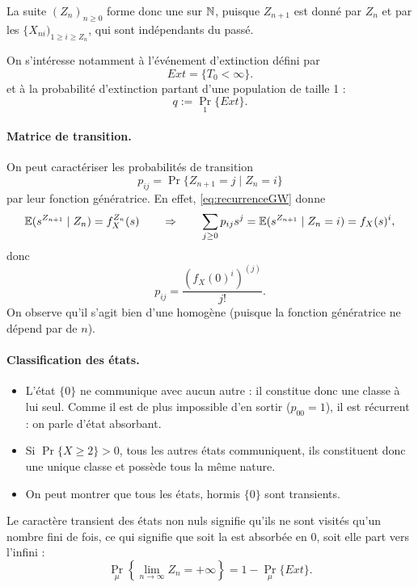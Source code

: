 La suite $(Z_n)_{n \geq 0}$ forme donc une \cM sur $\mathbb{N}$, puisque $Z_{n+1}$ est donné par $Z_n$ et par les $\{X_{ni})_{1 \geq i \geq Z_n}$, qui sont indépendants du passé.

\bigskip
On s'intéresse notamment à l'événement d'extinction défini par 
$$
Ext = \{T_0 < \infty\}.
$$
et à la probabilité d'extinction partant d'une population de taille 1 : 
$$
q := \Pr_1\{Ext\}.
$$


\paragraph*{Matrice de transition.} 
On peut caractériser les probabilités de transition 
$$
p_{ij} = \Pr\{Z_{n+1} = j \mid Z_n = i\}
$$
par leur fonction génératrice. En effet, \eqref{eq:recurrenceGW} donne
$$
\operatorname{\mathbb{E}}(s^{Z_{n+1}} \mid Z_n) = f_X^{Z_n}(s)
\qquad \Rightarrow \qquad 
\sum_{j \geq 0} p_{ij} s^j = \operatorname{\mathbb{E}}(s^{Z_{n+1}} \mid Z_n=i) = f_X(s)^i,
$$
donc
$$
p_{ij} = \frac{\left(f_X(0)^i\right)^{(j)}}{j!}.
$$
On observe qu'il s'agit bien d'une \cM homogène (puisque la fonction génératrice ne dépend par de $n$).

\paragraph*{Classification des états.} 
\begin{itemize}
 \item L'état $\{0\}$ ne communique avec aucun autre : il constitue donc une classe à lui seul. Comme il est de plus impossible d'en sortir ($p_{00} = 1$), il est récurrent : on parle d'état absorbant.
 \item Si $\Pr\{X \geq 2\} > 0$, tous les autres états communiquent, ils constituent donc une unique classe et possède tous la même nature.
 \item On peut montrer que tous les états, hormis $\{0\}$ sont transients.
\end{itemize}

Le caractère transient des états non nuls signifie qu'ils ne sont visités qu'un nombre fini de fois, ce qui signifie que soit la \cM est absorbée en 0, soit elle part vers l'infini : 
$$
\Pr_\mu\left\{ \lim_{n \to \infty} Z_n = + \infty\right\} = 1 - \Pr_\mu\{Ext\}.
$$


